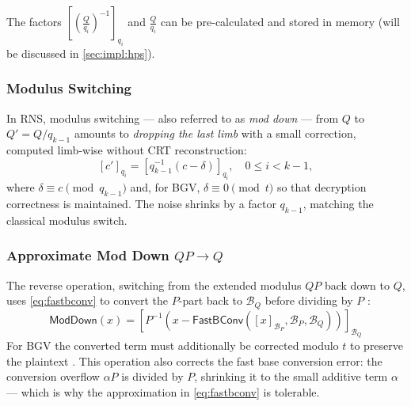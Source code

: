 \begin{remark}
    The factors $[(\frac{Q}{q_i})^{-1}]_{q_i}$ and $\frac{Q}{q_i}$ can be pre-calculated and stored in memory (will be discussed in \autoref{sec:impl:hps}).
\end{remark}




\subsubsection{Modulus Switching}
In RNS, modulus switching --- also referred to as \textit{mod down} --- from $Q$ to $Q' = Q/q_{k-1}$ amounts to \textit{dropping the last limb} with a small correction, computed limb-wise without CRT reconstruction:
\begin{equation}
    \label{eq:rns-modswitch}
    [c']_{q_i} = \left[q_{k-1}^{-1}\left(c - \delta\right)\right]_{q_i}, \quad 0 \leq i < k-1,
\end{equation}
where $\delta \equiv c \pmod{q_{k-1}}$ and, for BGV, $\delta \equiv 0 \pmod{t}$ so that decryption correctness is maintained. The noise shrinks by a factor $q_{k-1}$, matching the classical modulus switch.

\subsubsection{Approximate Mod Down $QP \to Q$}
The reverse operation, switching from the extended modulus $QP$ back down to $Q$, uses \eqref{eq:fastbconv} to convert the $P$-part back to $\mathcal{B}_Q$ before dividing by $P$ \autocite{cryptoeprint:2012/099, cryptoeprint:2018/117}:
\begin{equation}
    \label{eq:approxmoddown}
    \mathsf{ModDown}(x) = \left[P^{-1}\left(x - \mathsf{FastBConv}([x]_{\mathcal{B}_P}, \mathcal{B}_P, \mathcal{B}_Q)\right)\right]_{\mathcal{B}_Q}
\end{equation}
For BGV the converted term must additionally be corrected modulo $t$ to preserve the plaintext \cite{cryptoeprint:2021/204}. This operation also corrects the fast base conversion error: the conversion overflow $\alpha P$ is divided by $P$, shrinking it to the small additive term $\alpha$ --- which is why the approximation in \eqref{eq:fastbconv} is tolerable.

